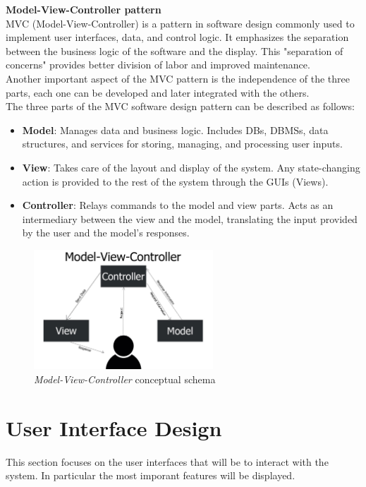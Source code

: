 \documentclass[12pt]{report}
\begin{document}
\bigskip
\noindent\textbf{Model-View-Controller pattern}\\
MVC (Model-View-Controller) is a pattern in software design commonly used to implement user interfaces, data, and control logic. It emphasizes the separation between the business logic of the software and the display. This "separation of concerns" provides better division of labor and improved maintenance.\\
Another important aspect of the MVC pattern is the independence of the three parts, each one can be developed and later integrated with the others.\\
The three parts of the MVC software design pattern can be described as follows:
\begin{itemize}
    \item\textbf{Model}: Manages data and business logic. Includes DBs, DBMSs, data structures, and services for storing, managing, and processing user inputs.
    \item\textbf{View}: Takes care of the layout and display of the system. Any state-changing action is provided to the rest of the system through the GUIs (Views).
    \item\textbf{Controller}: Relays commands to the model and view parts. Acts as an intermediary between the view and the model, translating the input provided by the user and the model's responses.
\end{itemize}

\begin{figure}[ht]
    \centering
    \includegraphics[width=0.6\textwidth]{assets/model-view-controller.jpg}
    \caption{\emph{Model-View-Controller} conceptual schema}
    \label{fig:my_label4}
\end{figure}
\clearpage

\chapter{User Interface Design}
This section focuses on the user interfaces that will be to interact with the system. In particular the most imporant features will be displayed.
\end{document}
